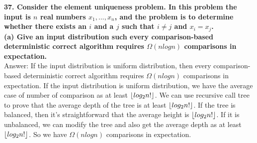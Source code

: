 \documentclass{article}
\DeclarePairedDelimiter\floor{\lfloor}{\rfloor}
\begin{document}
\textbf{37. Consider the element uniqueness problem. In this problem the input is $n$ real numbers $x_1,..., x_n$, and the problem is to determine whether there exists an $i$ and a $j$ such that $i\neq j$ and $x_i = x_j$.}\\\newline
\textbf{(a) Give an input distribution such every comparison-based deterministic correct algorithm requires $\Omega(nlogn)$ comparisons in expectation.} \\ \newline
Answer: If the input distribution is uniform distribution, then every comparison-based deterministic correct algorithm requires $\Omega(nlogn)$ comparisons in expectation. If the input distribution is uniform distribution, we have the average case of number of comparison as at least $\floor{log_2n!}$. We can use recursive call tree to prove that the average depth of the tree is at least $\floor{log_2n!}$. If the tree is balanced, then it's straightforward that the average height is $\floor{log_2n!}$. If it is unbalanced, we can modify the tree and also get the average depth as at least $\floor{log_2n!}$. So we have $\Omega(nlogn)$ comparisons in expectation. \\ \newline
\end{document}
